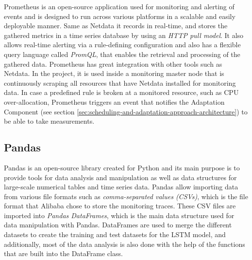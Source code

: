       Prometheus \cite{prometheusOverviewPrometheus} is an open-source application used for monitoring and alerting of events and is designed to run across various platforms in a scalable and easily deployable manner.
      Same as Netdata it records in real-time, and stores the gathered metrics in a time series database by using an \emph{HTTP pull model}. It also allows real-time alerting via a rule-defining configuration and also has a flexible query language called \emph{PromQL}, that enables the retrieval and processing of the gathered data. Prometheus has great integration with other tools such as Netdata.
      In the project, it is used inside a monitoring master node that is continuously scraping all resources that have Netdata installed for monitoring data. In case a predefined rule is broken at a monitored resource, such as CPU over-allocation, Prometheus triggers an event that notifies the Adaptation Component (see section \ref{sec:scheduling-and-adaptation-approach-architecture}) to be able to take measurements.


    \subsection{Pandas}
    \label{sec:pandas-third-party}

      Pandas \cite{pandasPandasDocumentationPandas} is an open-source library created for Python and its main purpose is to provide tools for data analysis and manipulation as well as data structures for large-scale numerical tables and time series data.
      Pandas allow importing data from various file formats such as \emph{comma-separated values (CSVs)}, which is the file format that Alibaba chose to store the monitoring traces.
      These CSV files are imported into \emph{Pandas DataFrames}, which is the main data structure used for data manipulation with Pandas. DataFrames are used to merge the different datasets to create the training and test datasets for the LSTM model, and additionally, most of the data analysis is also done with the help of the functions that are built into the DataFrame class.

